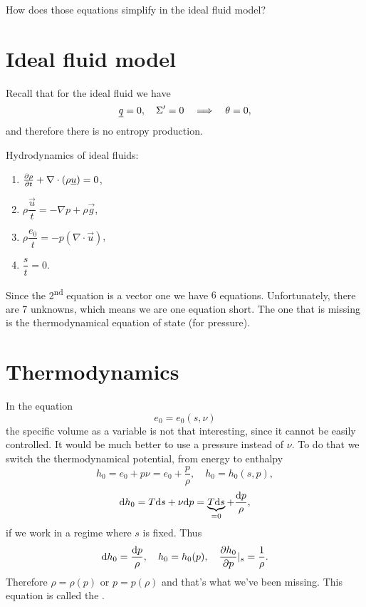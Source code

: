 \documentclass[../main.tex]{subfiles}
\begin{document}
    How does those equations simplify in the ideal fluid model?

    \section{Ideal fluid model}

    Recall that for the ideal fluid we have
    \begin{displaymath}
      \underline{q} = 0, \quad \Sigma' = 0 \quad \Longrightarrow \quad \theta = 0,
    \end{displaymath}
    and therefore there is no entropy production.

    Hydrodynamics of ideal fluids:
    \begin{enumerate}
      \item $\frac{\partial \rho}{\partial t} + \nabla \cdot (\rho \underline{u}) = 0$,
      \item $\rho \dfrac{\vec u}{t} = - \nabla p + \rho \vec g$,
      \item $ \rho \dfrac{e_0}{t} = - p(\nabla \cdot \vec u)$,
      \item $\dfrac{s}{t} = 0$.
    \end{enumerate}
    Since the 2\textsuperscript{nd} equation is a vector one we have $6$ equations. 
    Unfortunately, there are 7 unknowns, which means we are one equation short.
    The one that is missing is the thermodynamical equation of state (for pressure).

    \section{Thermodynamics}
    In the equation
    \begin{displaymath}
      e_0 = e_0(s , \nu)
    \end{displaymath}
    the specific volume as a variable is not that interesting, since it cannot be easily controlled. 
    It would be much better to use a pressure instead of $\nu$. 
    To do that we switch the thermodynamical potential, from energy to enthalpy
    \begin{displaymath}
      h_0 = e_0 + p \nu = e_0 + \frac{p}{\rho}, \quad h_0 = h_0(s, p), 
    \end{displaymath}
    \begin{displaymath}
      \mathrm{d} h_0 = T \mathrm{d} s + \nu \mathrm{d} p = \underbrace{T\mathrm{d} s}_{ = 0} + \frac{\mathrm{d} p}{\rho},
    \end{displaymath}
    if we work in a regime where $s$ is fixed.
    Thus 
    \begin{displaymath}
      \mathrm{d} h_0 = \frac{\mathrm{d} p}{\rho}, \quad h_0 = h_0(p),\quad \frac{\partial h_0}{\partial p}|_s = \frac{1}{\rho}.
    \end{displaymath}
    Therefore $\rho = \rho(p)$ or $p = p(\rho)$ and that's what we've been missing.
    This equation is called the .
    
\end{document}
